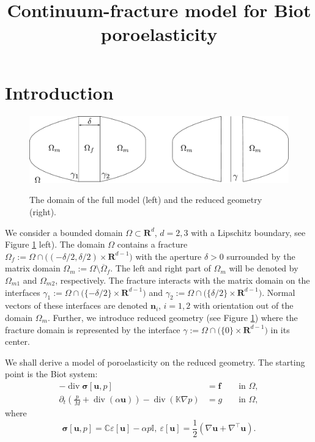 \documentclass[a4paper]{article}
\def\prtl{\partial}
\def\vc#1{\mathbf{\boldsymbol{#1}}}     %
\def\tn#1{{\mathbb{#1}}}    %
\def\div{\operatorname{div}}
\def\ep{\varepsilon}
\def\ff{\vc f}
\def\Real{{\mathbf R}}
\def\uu{\vc u}
\newcommand{\note}[2]{{\color{blue} \textbf{ #1:} \textit{#2}}}
\begin{document}
\title{Continuum-fracture model for Biot poroelasticity}
\maketitle

\section{Introduction}


\begin{figure}[h]
\centering
\includegraphics[width=12cm]{figures/full_model_domain}
\label{fig:omegas}
\caption{The domain of the full model (left) and the reduced geometry (right).}
\end{figure}

We consider a bounded domain $\Omega \subset \Real^d$, $d=2,3$ with a Lipschitz boundary, see Figure \ref{fig:omegas} left). The domain $\Omega$ contains 
a fracture $\Omega_f:=\Omega\cap \big((-\delta/2,\delta/2)\times\Real^{d-1}\big)$ 
with the aperture $\delta>0$ surrounded by the matrix domain $\Omega_m:=\Omega\setminus\overline\Omega_f$. 
The left and right part of $\Omega_m$ will be denoted by $\Omega_{m1}$ and $\Omega_{m2}$, respectively.
The fracture interacts with the matrix domain on the interfaces 
$\gamma_1:=\Omega\cap\big( \{-\delta/2\}\times \Real^{d-1}\big)$ and 
$\gamma_2:=\Omega\cap\big( \{ \delta/2\}\times \Real^{d-1}\big)$. Normal vectors of these interfaces are denoted $\vc n_i$, $i=1,2$ with orientation out of the domain $\Omega_m$.
Further, we introduce reduced geometry (see Figure \ref{fig:omegas})
where the fracture domain is represented by the interface $\gamma:=\Omega\cap\big(\{0\}\times\Real^{d-1}\big)$ in its center. 

We shall derive a model of poroelasticity on the reduced geometry.
The starting point is the Biot system:
\begin{subequations}
\label{eq:biot}
\begin{align}
    \label{eq:lin_el}
    -\div \vc\sigma[\uu,p] &= \ff &&\mbox{ in }\Omega, \\
    \prtl_t\left(\frac{p}{M} + \div(\alpha\uu)\right)-\div(\tn K\nabla p) &= g &&\mbox{ in }\Omega,
\end{align}
\end{subequations}
where
\[ \vc \sigma[\uu,p] = \tn C\ep[\uu]-\alpha p\tn I,~\ep[\uu]=\frac12(\nabla\uu+\nabla^\top\uu). \]
\end{document}
